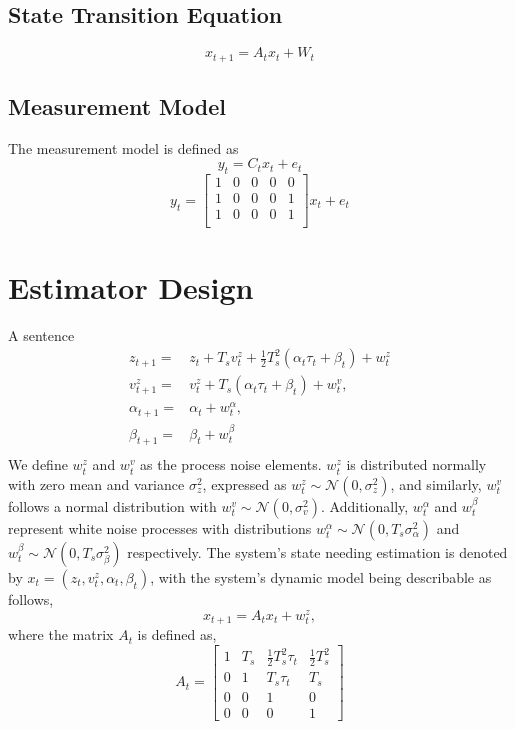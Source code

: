 \documentclass{article}
\begin{document}
\subsection{State Transition Equation}
\begin{equation}
    {x}_{t+1} = A_t {x}_t + W_t
\end{equation}

\subsection{Measurement Model}
The measurement model is defined as
\begin{equation}
y_t = C_t x_t + e_t
\end{equation}
\begin{equation}
    y_t  = 
    \begin{bmatrix}
        1 & 0 & 0 & 0 & 0 \\
        1 & 0 & 0 & 0 & 1 \\
        1 & 0 & 0 & 0 & 1 \\
    \end{bmatrix}
        x_t + e_t
\end{equation}

\section{Estimator Design}
A sentence
\begin{align}
    z_{t+1} =& z_t + T_s v_t^z + \frac{1}{2} T_s^2 (\alpha_t \tau_t + \beta_t) + w_t^z\\
    v_{t+1}^z =& v_t^z + T_s (\alpha_t \tau_t + \beta_t) + w_t^v,\\
    \alpha_{t+1} =& \alpha_t + w_t^\alpha,\\
    \beta_{t+1} =& \beta_t + w_t^\beta\\
\end{align}
We define $w_t^z$ and $w_t^v$ as the process noise elements.
$w_t^z$ is distributed normally with zero mean and variance
$\sigma_z^2$, expressed as $w_t^z \sim \mathcal{N}(0, \sigma_z^2)$, 
and similarly, $w_t^v$ follows a normal distribution with $w_t^v \sim \mathcal{N}(0, \sigma_v^2)$.
Additionally, $w_t^\alpha$ and $w_t^\beta$ represent white noise processes with distributions
$w_t^\alpha \sim \mathcal{N}(0, T_s \sigma_\alpha^2)$ and $w_t^\beta \sim \mathcal{N}(0, T_s \sigma_\beta^2)$ 
respectively. The system's state needing estimation is denoted by $x_t = (z_t, v_t^z, \alpha_t, \beta_t)$, 
with the system's dynamic model being describable as follows,
\begin{equation}
    x_{t+1} = A_t x_t + w_t^z,
\end{equation}
where the matrix $A_t$ is defined as,
\begin{equation}
    A_t = 
    \begin{bmatrix}
    1 & T_s & \frac{1}{2} T_s^2 \tau_t & \frac{1}{2} T_s^2 \\
    0 & 1 & T_s \tau_t & T_s \\
    0 & 0 & 1 & 0 \\
    0 & 0 & 0 & 1
    \end{bmatrix}
\end{equation}
\end{document}
